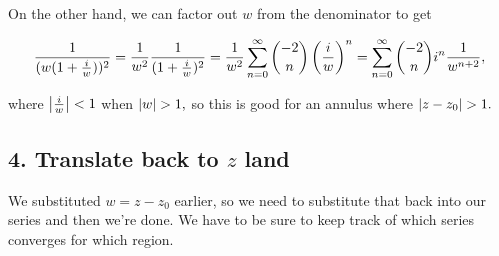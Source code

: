 \documentclass{article}
\begin{document}
On the other hand, we can factor out $w$ from the denominator to get

\[ \frac{1}{(w(1+\frac{i}{w}))^{2}} = \frac{1}{w^2} \frac{1}{(1 + \frac{i}{w})^2} = \frac{1}{w^2} \sum_{n=0}^{\infty} \binom{-2}{n} \left(\frac{i}{w}\right) ^n = \sum_{n=0}^{\infty} \binom{-2}{n} i^n \frac{1}{w^{n+2}}, \]

where $\left| \frac{i}{w} \right| < 1$ when $\left| w \right| > 1,$ so this is good for an annulus where $\left| z - z_0 \right| > 1.$

\subsection{4. Translate back to $z$ land}

We substituted $w = z - z_0$ earlier, so we need to substitute that back into our series and then we're done. We have to be sure to keep track of which series converges for which region.
\end{document}
